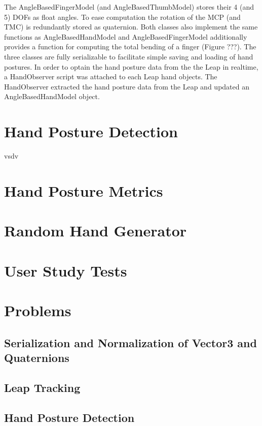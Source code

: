 The AngleBasedFingerModel (and AngleBasedThumbModel) stores their 4 (and 5) DOFs as float angles. To ease computation the rotation of the MCP (and TMC) is redundantly stored as quaternion. Both classes also implement the same functions as AngleBasedHandModel and AngleBasedFingerModel additionally provides a function for computing the total bending of a finger (\textcolor[rgb]{1,0,0}{Figure ???}). The three classes are fully serializable to facilitate simple saving and loading of hand postures.
In order to optain the hand posture data from the the Leap in realtime, a HandObserver script was attached to each Leap hand objects. The HandObserver extracted the hand posture data from the Leap and updated an AngleBasedHandModel object.

\section{Hand Posture Detection}
vsdv
\section{Hand Posture Metrics}\label{chapter:handosturemetric}

\section{Random Hand Generator}

\section{User Study Tests}

\section{Problems}

\subsection{Serialization and Normalization of Vector3 and Quaternions}

\subsection{Leap Tracking}

\subsection{Hand Posture Detection}

